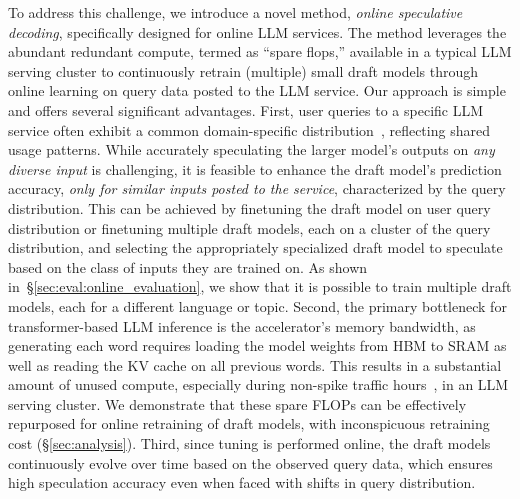 To address this challenge, we introduce a novel method, \emph{online speculative decoding}, specifically designed for online LLM services.
The method leverages the abundant redundant compute, termed as ``spare flops,'' available in a typical LLM serving cluster to continuously retrain (multiple) small draft models through online learning on query data posted to the LLM service. Our approach is simple and offers several significant advantages.
First, user queries to a specific LLM service often exhibit a common domain-specific distribution~\citep{zheng2023lmsys}, reflecting shared usage patterns.
While accurately speculating the larger model's outputs on \emph{any diverse input} is challenging, it is feasible to enhance the draft model's prediction accuracy, \emph{only for similar inputs posted to the service}, characterized by the query distribution. This can be achieved by finetuning the draft model on user query distribution or finetuning multiple draft models, each on a cluster of the query distribution, and selecting the appropriately specialized draft model to speculate based on the class of inputs they are trained on. As shown in~\S\ref{sec:eval:online_evaluation}, we show that it is possible to train multiple draft models, each for a different language or topic. 
Second, the primary bottleneck for transformer-based LLM inference is the accelerator's memory bandwidth, as generating each word requires loading the model weights from HBM to SRAM as well as reading the KV cache on all previous words. 
This results in a substantial amount of unused compute, especially during non-spike traffic hours~\citep{spector2023accelerating,chen2023accelerating,kwon2023efficient}, in an LLM serving cluster. We demonstrate that these spare FLOPs can be effectively repurposed for online retraining of draft models, with inconspicuous retraining cost (\S\ref{sec:analysis}).
Third, since tuning is performed online, the draft models continuously evolve over time based on the observed query data, which ensures high speculation accuracy even when faced with shifts in query distribution.




